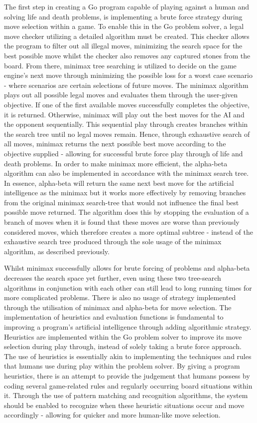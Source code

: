 \documentclass{l3proj}
\begin{document}
The first step in creating a Go program capable of playing against a human and solving life and death problems, is implementing a brute force strategy during move selection within a game. To enable this in the Go problem solver, a legal move checker utilizing a detailed algorithm must be created. This checker allows the program to filter out all illegal moves, minimizing the search space for the best possible move whilst the checker also removes any captured stones from the board. From there, minimax tree searching is utilized to decide on the game engine's next move through minimizing the possible loss for a worst case scenario - where scenarios are certain selections of future moves. The minimax algorithm plays out all possible legal moves and evaluates them through the user-given objective. If one of the first available moves successfully completes the objective, it is returned. Otherwise, minimax will play out the best moves for the AI and the opponent sequentially. This sequential play through creates branches within the search tree until no legal moves remain. Hence, through exhaustive search of all moves, minimax returns the next possible best move according to the objective supplied - allowing for successful brute force play through of life and death problems.
In order to make minimax more efficient, the alpha-beta algorithm can also be implemented in accordance with the minimax search tree. In essence, alpha-beta will return the same next best move for the artificial intelligence as the minimax but it works more effectively by removing branches from the original minimax search-tree that would not influence the final best possible move returned. The algorithm does this by stopping the evaluation of a branch of moves when it is found that these moves are worse than previously considered moves, which therefore creates a more optimal subtree - instead of the exhaustive search tree produced through the sole usage of the minimax algorithm, as described previously.

Whilst minimax successfully allows for brute forcing of problems and alpha-beta decreases the search space yet further, even using these two tree-search algorithms in conjunction with each other can still lead to long running times for more complicated problems. There is also no usage of strategy implemented through the utilisation of minimax and alpha-beta for move selection. The implementation of heuristics and evaluation functions is fundamental to improving a program's artificial intelligence through adding algorithmic strategy. Heuristics are implemented within the Go problem solver to improve its move selection during play through, instead of solely taking a brute force approach. The use of heuristics is essentially akin to implementing the techniques and rules that humans use during play within the problem solver. By giving a program heuristics, there is an attempt to provide the judgement that humans possess by coding several game-related rules and regularly occurring board situations within it. Through the use of pattern matching and recognition algorithms, the system should be enabled to recognize when these heuristic situations occur and move accordingly - allowing for quicker and more human-like move selection.
\end{document}
